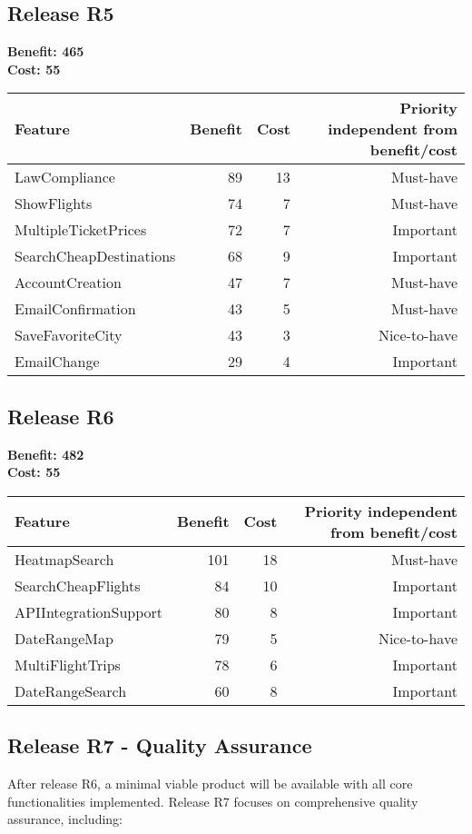\subsection{Release R5}
\textbf{Benefit: 465} \\
\textbf{Cost: 55} \\

\begin{tabular}{lrrr}
\toprule
\textbf{Feature} & \textbf{Benefit} & \textbf{Cost} & \textbf{Priority} independent from benefit/cost \\
\midrule
LawCompliance & 89 & 13 & Must-have \\
ShowFlights & 74 & 7 & Must-have \\
MultipleTicketPrices & 72 & 7 & Important \\
SearchCheapDestinations & 68 & 9 & Important \\
AccountCreation & 47 & 7 & Must-have \\
EmailConfirmation & 43 & 5 & Must-have \\
SaveFavoriteCity & 43 & 3 & Nice-to-have \\
EmailChange & 29 & 4 & Important \\
\bottomrule
\end{tabular}

\subsection{Release R6}
\textbf{Benefit: 482} \\
\textbf{Cost: 55} \\

\begin{tabular}{lrrr}
\toprule
\textbf{Feature} & \textbf{Benefit} & \textbf{Cost} & \textbf{Priority} independent from benefit/cost \\
\midrule
HeatmapSearch & 101 & 18 & Must-have \\
SearchCheapFlights & 84 & 10 & Important \\
APIIntegrationSupport & 80 & 8 & Important \\
DateRangeMap & 79 & 5 & Nice-to-have \\
MultiFlightTrips & 78 & 6 & Important \\
DateRangeSearch & 60 & 8 & Important \\
\bottomrule
\end{tabular}

\subsection{Release R7 - Quality Assurance}
After release R6, a minimal viable product will be available with all core functionalities implemented. Release R7 focuses on comprehensive quality assurance, including:

